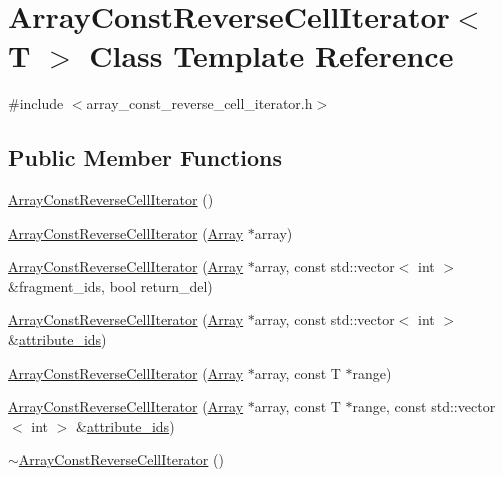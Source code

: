 \hypertarget{classArrayConstReverseCellIterator}{}\section{Array\+Const\+Reverse\+Cell\+Iterator$<$ T $>$ Class Template Reference}
\label{classArrayConstReverseCellIterator}


{\ttfamily \#include $<$array\+\_\+const\+\_\+reverse\+\_\+cell\+\_\+iterator.\+h$>$}

\subsection*{Public Member Functions}
\begin{DoxyCompactItemize}
\item 
\hyperlink{classArrayConstReverseCellIterator_a47b2e311a8f12581add8b3d05b084e36}{Array\+Const\+Reverse\+Cell\+Iterator} ()
\item 
\hyperlink{classArrayConstReverseCellIterator_a05308f2d1d1fede3385e9ba4ab9016f3}{Array\+Const\+Reverse\+Cell\+Iterator} (\hyperlink{classArray}{Array} $\ast$array)
\item 
\hyperlink{classArrayConstReverseCellIterator_ae67c03ec8e4646800a39b08a36183a3e}{Array\+Const\+Reverse\+Cell\+Iterator} (\hyperlink{classArray}{Array} $\ast$array, const std\+::vector$<$ int $>$ \&fragment\+\_\+ids, bool return\+\_\+del)
\item 
\hyperlink{classArrayConstReverseCellIterator_a402088aaa036ea2204c581ffe40bbb62}{Array\+Const\+Reverse\+Cell\+Iterator} (\hyperlink{classArray}{Array} $\ast$array, const std\+::vector$<$ int $>$ \&\hyperlink{classArrayConstReverseCellIterator_afaa7fc34fe9db187c6f3ed04f0e764e1}{attribute\+\_\+ids})
\item 
\hyperlink{classArrayConstReverseCellIterator_a7fb978de1681232a9a6a6f21aed07ad1}{Array\+Const\+Reverse\+Cell\+Iterator} (\hyperlink{classArray}{Array} $\ast$array, const T $\ast$range)
\item 
\hyperlink{classArrayConstReverseCellIterator_ae109313f4f71d1837d6ff6aac940e5b4}{Array\+Const\+Reverse\+Cell\+Iterator} (\hyperlink{classArray}{Array} $\ast$array, const T $\ast$range, const std\+::vector$<$ int $>$ \&\hyperlink{classArrayConstReverseCellIterator_afaa7fc34fe9db187c6f3ed04f0e764e1}{attribute\+\_\+ids})
\item 
\hyperlink{classArrayConstReverseCellIterator_a23bdd30cb926a94255c7ade3de0299cb}{$\sim$\+Array\+Const\+Reverse\+Cell\+Iterator} ()

\end{DoxyCompactItemize}

